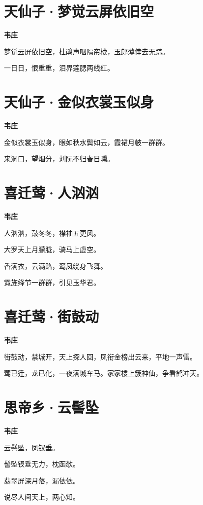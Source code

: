 \documentclass[12pt,a4paper]{ctexbook}
\begin{document}
\section{天仙子·梦觉云屏依旧空}
\textbf{韦庄}\par\vspace{0.5em}
梦觉云屏依旧空，杜鹃声咽隔帘栊，玉郎薄倖去无踪。\par
一日日，恨重重，泪界莲腮两线红。\par

\section{天仙子·金似衣裳玉似身}
\textbf{韦庄}\par\vspace{0.5em}
金似衣裳玉似身，眼如秋水鬓如云，霞裙月帔一群群。\par
来洞口，望烟分，刘阮不归春日曛。\par

\section{喜迁莺·人汹汹}
\textbf{韦庄}\par\vspace{0.5em}
人汹汹，鼓冬冬，襟袖五更风。\par
大罗天上月朦胧，骑马上虚空。\par
香满衣，云满路，鸾凤绕身飞舞。\par
霓旌绛节一群群，引见玉华君。\par

\section{喜迁莺·街鼓动}
\textbf{韦庄}\par\vspace{0.5em}
街鼓动，禁城开，天上探人回，凤衔金榜出云来，平地一声雷。\par
莺已迁，龙已化，一夜满城车马。家家楼上簇神仙，争看鹤冲天。\par

\section{思帝乡·云髻坠}
\textbf{韦庄}\par\vspace{0.5em}
云髻坠，凤钗垂。\par
髻坠钗垂无力，枕函欹。\par
翡翠屏深月落，漏依依。\par
说尽人间天上，两心知。\par
\end{document}
